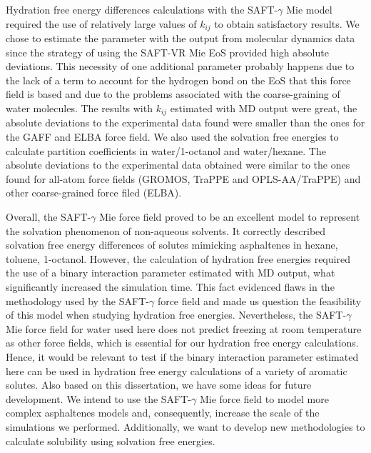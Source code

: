 Hydration free energy differences calculations with the SAFT-$\gamma$ Mie model required the use of relatively large values of $k_{ij}$ to obtain satisfactory results. We chose to estimate the parameter with the output from molecular dynamics data since the strategy of using the SAFT-VR Mie EoS provided high absolute deviations. This necessity of one additional parameter probably happens due to the lack of a term to account for the hydrogen bond on the EoS that this force field is based and due to the problems associated with the coarse-graining of water molecules. The results with $k_{ij}$ estimated with MD output were great, the absolute deviations to the experimental data found were smaller than the ones for the GAFF and ELBA force field. We also used the solvation free energies to calculate partition coefficients in water/1-octanol and water/hexane. The absolute deviations to the experimental data obtained were similar to the ones found for all-atom force fields (GROMOS, TraPPE and OPLS-AA/TraPPE) and other coarse-grained force filed (ELBA).

Overall, the SAFT-$\gamma$ Mie force field proved to be an excellent model to represent the solvation phenomenon of non-aqueous solvents. It correctly described solvation free energy differences of solutes mimicking asphaltenes in hexane, toluene, 1-octanol. However, the calculation of hydration free energies required the use of a binary interaction parameter estimated with MD output, what significantly increased the simulation time. This fact evidenced flaws in the methodology used by the SAFT-$\gamma$ force field and made us question the feasibility of this model when studying hydration free energies. Nevertheless, the SAFT-$\gamma$ Mie force field for water used here does not predict freezing at room temperature as other force fields, which is essential for our hydration free energy calculations. Hence, it would be relevant to test if the binary interaction parameter estimated here can be used in hydration free energy calculations of a variety of aromatic solutes. Also based on this dissertation, we have some ideas for future development. We intend to use the SAFT-$\gamma$ Mie force field to model more complex asphaltenes models and, consequently, increase the scale of the simulations we performed. Additionally, we want to develop new methodologies to calculate solubility using solvation free energies.


